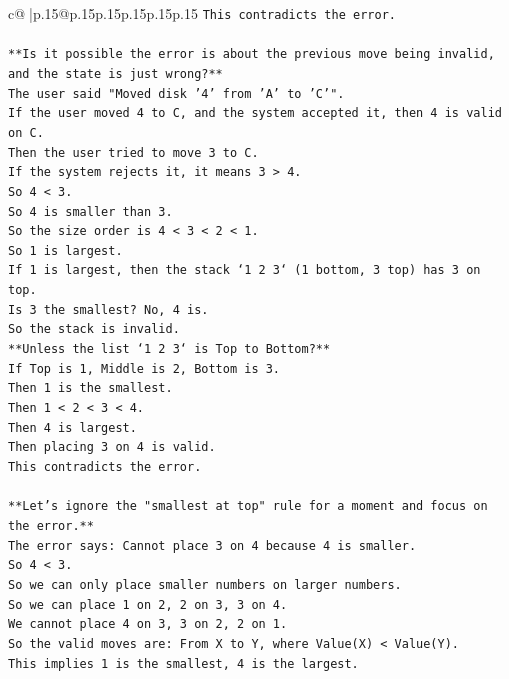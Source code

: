 \documentclass{article}
\begin{document}
{\begin{supertabular}{c@{$\;$}|p{.15\linewidth}@{}p{.15\linewidth}p{.15\linewidth}p{.15\linewidth}p{.15\linewidth}p{.15\linewidth}}
{{{\texttt{This contradicts the error.} \\
\\ 
\texttt{**Is it possible the error is about the previous move being invalid, and the state is just wrong?**} \\
\texttt{The user said "Moved disk '4' from 'A' to 'C'".} \\
\texttt{If the user moved 4 to C, and the system accepted it, then 4 is valid on C.} \\
\texttt{Then the user tried to move 3 to C.} \\
\texttt{If the system rejects it, it means 3 > 4.} \\
\texttt{So 4 < 3.} \\
\texttt{So 4 is smaller than 3.} \\
\texttt{So the size order is 4 < 3 < 2 < 1.} \\
\texttt{So 1 is largest.} \\
\texttt{If 1 is largest, then the stack `1 2 3` (1 bottom, 3 top) has 3 on top.} \\
\texttt{Is 3 the smallest? No, 4 is.} \\
\texttt{So the stack is invalid.} \\
\texttt{**Unless the list `1 2 3` is Top to Bottom?**} \\
\texttt{If Top is 1, Middle is 2, Bottom is 3.} \\
\texttt{Then 1 is the smallest.} \\
\texttt{Then 1 < 2 < 3 < 4.} \\
\texttt{Then 4 is largest.} \\
\texttt{Then placing 3 on 4 is valid.} \\
\texttt{This contradicts the error.} \\
\\ 
\texttt{**Let's ignore the "smallest at top" rule for a moment and focus on the error.**} \\
\texttt{The error says: Cannot place 3 on 4 because 4 is smaller.} \\
\texttt{So 4 < 3.} \\
\texttt{So we can only place smaller numbers on larger numbers.} \\
\texttt{So we can place 1 on 2, 2 on 3, 3 on 4.} \\
\texttt{We cannot place 4 on 3, 3 on 2, 2 on 1.} \\
\texttt{So the valid moves are: From X to Y, where Value(X) < Value(Y).} \\
\texttt{This implies 1 is the smallest, 4 is the largest.} \\
}}}
\end{supertabular}}
\end{document}

